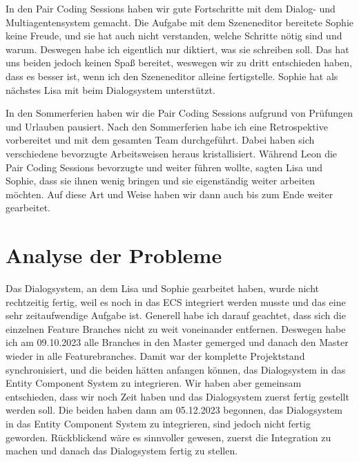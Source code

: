 In den Pair Coding Sessions haben wir gute Fortschritte mit dem Dialog- und Multiagentensystem gemacht. Die Aufgabe mit dem Szeneneditor bereitete Sophie keine Freude, und sie hat auch nicht verstanden, welche Schritte nötig sind und warum. Deswegen habe ich eigentlich nur diktiert, was sie schreiben soll. Das hat uns beiden jedoch keinen Spaß bereitet, weswegen wir zu dritt entschieden haben, dass es besser ist, wenn ich den Szeneneditor alleine fertigstelle. Sophie hat als nächstes Lisa mit beim Dialogsystem unterstützt.

In den Sommerferien haben wir die Pair Coding Sessions aufgrund von Prüfungen und Urlauben pausiert. Nach den Sommerferien habe ich eine Retrospektive vorbereitet und mit dem gesamten Team durchgeführt. Dabei haben sich verschiedene bevorzugte Arbeitsweisen heraus kristallisiert. Während Leon die Pair Coding Sessions bevorzugte und weiter führen wollte, sagten Lisa und Sophie, dass sie ihnen wenig bringen und sie eigenständig weiter arbeiten möchten. Auf diese Art und Weise haben wir dann auch bis zum Ende weiter gearbeitet.

\section{Analyse der Probleme}

Das Dialogsystem, an dem Lisa und Sophie gearbeitet haben, wurde nicht rechtzeitig fertig, weil es noch in das ECS integriert werden musste und das eine sehr zeitaufwendige Aufgabe ist. Generell habe ich darauf geachtet, dass sich die einzelnen Feature Branches nicht zu weit voneinander entfernen. Deswegen habe ich am 09.10.2023 alle Branches in den Master gemerged und danach den Master wieder in alle Featurebranches. Damit war der komplette Projektstand synchronisiert, und die beiden hätten anfangen können, das Dialogsystem in das Entity Component System zu integrieren. Wir haben aber gemeinsam entschieden, dass wir noch Zeit haben und das Dialogsystem zuerst fertig gestellt werden soll. Die beiden haben dann am 05.12.2023 begonnen, das Dialogsystem in das Entity Component System zu integrieren, sind jedoch nicht fertig geworden. Rückblickend wäre es sinnvoller gewesen, zuerst die Integration zu machen und danach das Dialogsystem fertig zu stellen.

